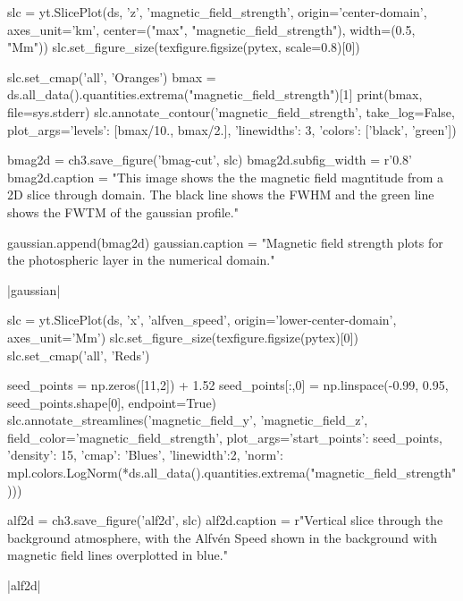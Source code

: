 \begin{pycode}[chapter3]
slc = yt.SlicePlot(ds, 'z', 'magnetic_field_strength', origin='center-domain',
                   axes_unit='km', center=("max", "magnetic_field_strength"),
                   width=(0.5, "Mm"))
slc.set_figure_size(texfigure.figsize(pytex, scale=0.8)[0])

slc.set_cmap('all', 'Oranges')
bmax = ds.all_data().quantities.extrema("magnetic_field_strength")[1]
print(bmax, file=sys.stderr)
slc.annotate_contour('magnetic_field_strength', take_log=False,
                     plot_args={'levels': [bmax/10., bmax/2.],
                                'linewidths': 3,
                                'colors': ['black', 'green']})

bmag2d = ch3.save_figure('bmag-cut', slc)
bmag2d.subfig_width = r'0.8\columnwidth'
bmag2d.caption = "This image shows the the magnetic field magntitude from a 2D slice through domain. The black line shows the FWHM and the green line shows the FWTM of the gaussian profile."

gaussian.append(bmag2d)
gaussian.caption = "Magnetic field strength plots for the photospheric layer in the numerical domain."

\end{pycode}

\py[chapter3]|gaussian|

\begin{pycode}[chapter3]
slc = yt.SlicePlot(ds, 'x', 'alfven_speed', origin='lower-center-domain',
                   axes_unit='Mm')
slc.set_figure_size(texfigure.figsize(pytex)[0])
slc.set_cmap('all', 'Reds')

seed_points = np.zeros([11,2]) + 1.52
seed_points[:,0] = np.linspace(-0.99, 0.95, seed_points.shape[0], endpoint=True)
slc.annotate_streamlines('magnetic_field_y', 'magnetic_field_z',
                         field_color='magnetic_field_strength',
                         plot_args={'start_points': seed_points, 'density': 15,
                                    'cmap': 'Blues', 'linewidth':2,
                                    'norm': mpl.colors.LogNorm(*ds.all_data().quantities.extrema("magnetic_field_strength"))})

alf2d = ch3.save_figure('alf2d', slc)
alf2d.caption = r"Vertical slice through the background atmosphere, with the Alfv\'en Speed shown in the background with magnetic field lines overplotted in blue."
\end{pycode}

\py[chapter3]|alf2d|

